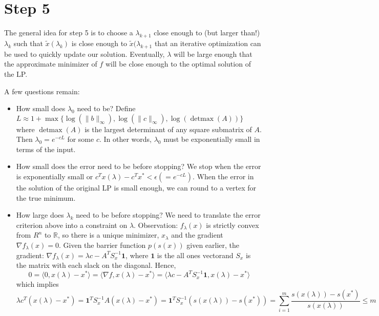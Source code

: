 \documentclass[11pt]{article}
\begin{document}
\section*{Step 5}
The general idea for step 5 is to choose a $\lambda_{k+1}$ close enough to (but larger than!) $\lambda_k$ such that $\tilde{x}(\lambda_k)$ is close enough to $\tilde{x}(\lambda_{k+1}$ that an iterative optimization can be used to quickly update our solution. Eventually, $\lambda$ will be large enough that the approximate minimizer of $f$ will be close enough to the optimal solution of the LP.

A few questions remain:
\begin{itemize}
    \item How small does $\lambda_0$ need to be? Define $L \approx 1 + \max\{\log(\|b\|_\infty),\log(\|c\|_\infty), \log(\mathop{detmax}(A))\}$ where $\mathop{detmax}(A)$ is the largest determinant of any square submatrix of $A$. Then $\lambda_0 = e^{-cL}$ for some $c$. In other words, $\lambda_0$ must be exponentially small in terms of the input.
    \item How small does the error need to be before stopping? We stop when the error is exponentially small or $c^Tx(\lambda) - c^T x^* < \epsilon (= e^{-cL})$. When the error in the solution of the original LP is small enough, we can round to a vertex for the true minimum. 
    \item How large does $\lambda_k$ need to be before stopping? We need to translate the error criterion above into a constraint on $\lambda$. Observation: $f_{\lambda}(x)$ is strictly convex from $R^n$ to $\mathbb{R}$, so there is a unique minimizer, $x_\lambda$ and the gradient $\nabla f_\lambda(x) = 0$. Given the barrier function $p(s(x))$ given earlier, the gradient: $\nabla f_\lambda(x) = \lambda c - A^TS^{-1}_x \mathbf{1}$, where $\mathbf{1}$ is the all ones vectorand $S_x$ is the matrix with each slack on the diagonal. Hence,
        \begin{equation}
            0 = \langle0,x(\lambda) - x^*\rangle = \langle\nabla f, x(\lambda) - x^*\rangle = \langle\lambda c - A^TS_x^{-1}\mathbf{1}, x(\lambda) - x^*\rangle
        \end{equation}
        which implies
        \begin{equation}
            \lambda c^T (x(\lambda) - x^*) = \mathbf{1}^TS_x^{-1}A(x(\lambda) - x^*) = \mathbf{1}^TS_x^{-1}(s(x(\lambda)) - s(x^*)) = \displaystyle\sum_{i=1}^m \frac{s(x(\lambda)) - s(x^*)}{s(x(\lambda))} \leq m
        \end{equation}

\end{itemize}
\end{document}
